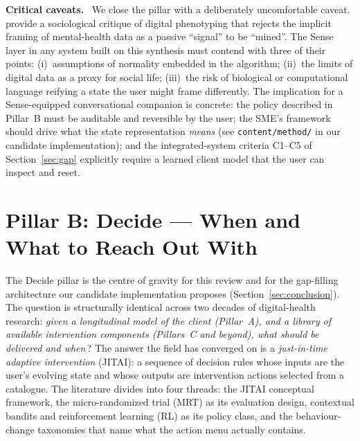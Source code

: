 \documentclass[10pt,conference]{article}
\newcommand{\secref}[1]{Section~\ref{#1}}
\renewcommand{\paragraph}[1]{\smallskip\par\noindent\textbf{#1}~\ignorespaces}
\begin{document}
\paragraph{Critical caveats.}
We close the pillar with a deliberately uncomfortable caveat.
\cite{BirkSamuel2020DigitalPhenotypingCritique} provide a sociological
critique of digital phenotyping that rejects the implicit framing of
mental-health data as a passive ``signal'' to be ``mined''. The
Sense layer in any system built on this synthesis must contend with
three of their points: (i)~assumptions of normality embedded in the
algorithm; (ii)~the limits of digital data as a proxy for social
life; (iii)~the risk of biological or computational language reifying
a state the user might frame differently. The implication for a
Sense-equipped conversational companion is concrete: the policy
described in Pillar~B must be auditable and reversible by the user;
the SME's framework should drive what the state representation
\emph{means} (see \texttt{content/method/} in our candidate
implementation); and the integrated-system criteria
\mbox{C1--C5} of \secref{sec:gap} explicitly require a learned client
model that the user can inspect and reset.

\section{Pillar B: Decide --- When and What to Reach Out With}\label{sec:decide}

The Decide pillar is the centre of gravity for this review and for
the gap-filling architecture our candidate implementation proposes
(\secref{sec:conclusion}). The question is structurally identical
across two decades of digital-health research: \emph{given a
longitudinal model of the client (Pillar~A), and a library of available
intervention components (Pillars~C and beyond), what should be delivered
and when}\,? The answer the field has converged on is a
\emph{just-in-time adaptive intervention} (JITAI): a sequence of
decision rules whose inputs are the user's evolving state and whose
outputs are intervention actions selected from a catalogue. The
literature divides into four threads: the JITAI conceptual framework,
the micro-randomized trial (MRT) as its evaluation design, contextual
bandits and reinforcement learning (RL) as its policy class, and the
behaviour-change taxonomies that name what the action menu actually
contains.
\end{document}
